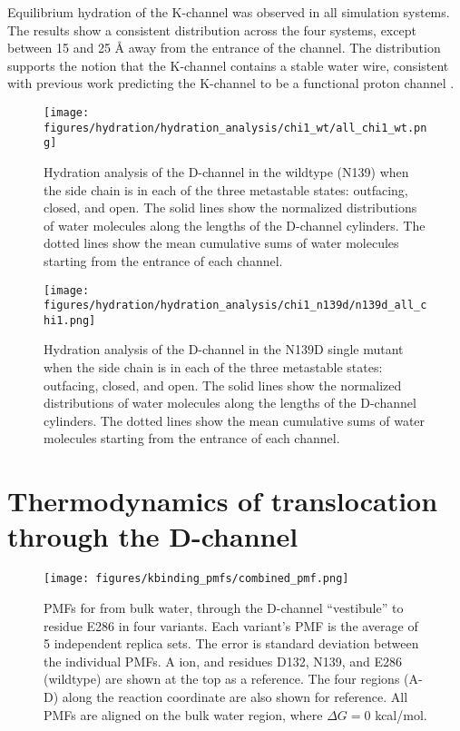 Equilibrium hydration of the K-channel was observed in all simulation systems. The results show a consistent distribution across the four systems, except between 15 and 25 Å away from the entrance of the channel. The distribution supports the notion that the K-channel contains a stable water wire, consistent with previous work predicting the K-channel to be a functional proton channel \cite{Tomson:2003p10255,Ganesan:2010p8417}.

\begin{figure}[htbp]
\centering
\texttt{[image: figures/hydration/hydration\_analysis/chi1\_wt/all\_chi1\_wt.png]}
\caption[Hydration analysis of the D-channel in the wildtype (N139) when the side chain is in each of the three metastable states: outfacing, closed, and open.]{Hydration analysis of the D-channel in the wildtype (N139) when the side chain is in each of the three metastable states: outfacing, closed, and open. The solid lines show the normalized distributions of water molecules along the lengths of the D-channel cylinders. The dotted lines show the mean cumulative sums of water molecules starting from the entrance of each channel.}
\label{fig:hydration_n139_allchi1}
\end{figure}

\begin{figure}[htbp]
\centering
\texttt{[image: figures/hydration/hydration\_analysis/chi1\_n139d/n139d\_all\_chi1.png]}
\caption[Hydration analysis of the D-channel in the N139D single mutant when the side chain is in each of the three metastable states: outfacing, closed, and open.]{Hydration analysis of the D-channel in the N139D single mutant when the side chain is in each of the three metastable states: outfacing, closed, and open. The solid lines show the normalized distributions of water molecules along the lengths of the D-channel cylinders. The dotted lines show the mean cumulative sums of water molecules starting from the entrance of each channel.}
\label{fig:hydration_n139d_allchi1}
\end{figure}

\section{Thermodynamics of  translocation through the D-channel}
\label{sec:results-kplus}

\begin{figure}[htbp]
\centering
\texttt{[image: figures/kbinding\_pmfs/combined\_pmf.png]}
\caption[PMFs for  from bulk water, through the D-channel ``vestibule'' to residue E286 in four variants.]{PMFs for  from bulk water, through the D-channel ``vestibule'' to residue E286 in four variants. Each variant's PMF is the average of 5 independent replica sets. The error is standard deviation between the individual PMFs. A  ion, and residues D132, N139, and E286 (wildtype) are shown at the top as a reference. The four regions (A-D) along the reaction coordinate are also shown for reference. All PMFs are aligned on the bulk water region, where $\Delta G = 0$ kcal/mol.}
\label{fig:pmfs_kbinding}
\end{figure}

